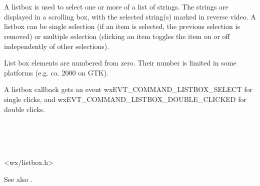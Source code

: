 \section{}\label{wxlistbox}

A listbox is used to select one or more of a list of strings. The
strings are displayed in a scrolling box, with the selected string(s)
marked in reverse video. A listbox can be single selection (if an item
is selected, the previous selection is removed) or multiple selection
(clicking an item toggles the item on or off independently of other
selections).

List box elements are numbered from zero. Their number is limited in
some platforms (e.g. ca. 2000 on GTK).

A listbox callback gets an event wxEVT\_COMMAND\_LISTBOX\_SELECT for single clicks, and
wxEVT\_COMMAND\_LISTBOX\_DOUBLE\_CLICKED for double clicks.


\\
\\
\\


<wx/listbox.h>


\twocolwidtha{5cm}%
\begin{twocollist}\itemsep=0pt
\end{twocollist}

See also .


